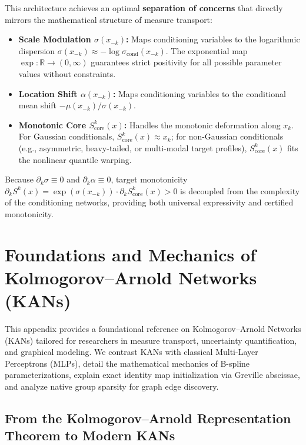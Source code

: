 \documentclass[11pt,a4paper]{article}
\theoremstyle{plain}
\theoremstyle{definition}
\theoremstyle{remark}
\begin{document}
This architecture achieves an optimal \textbf{separation of concerns} that directly mirrors the mathematical structure of measure transport:
\begin{itemize}
    \item \textbf{Scale Modulation $\sigma(x_{-k})$:} Maps conditioning variables to the logarithmic dispersion $\sigma(x_{-k}) \approx -\log \sigma_{\text{cond}}(x_{-k})$. The exponential map $\exp: \mathbb{R} \to (0, \infty)$ guarantees strict positivity for all possible parameter values without constraints.
    \item \textbf{Location Shift $\alpha(x_{-k})$:} Maps conditioning variables to the conditional mean shift $-\mu(x_{-k}) / \sigma(x_{-k})$.
    \item \textbf{Monotonic Core $S^k_{\text{core}}(x)$:} Handles the monotonic deformation along $x_k$. For Gaussian conditionals, $S^k_{\text{core}}(x) \approx x_k$; for non-Gaussian conditionals (e.g., asymmetric, heavy-tailed, or multi-modal target profiles), $S^k_{\text{core}}(x)$ fits the nonlinear quantile warping.
\end{itemize}
Because $\partial_k \sigma \equiv 0$ and $\partial_k \alpha \equiv 0$, target monotonicity $\partial_k S^k(x) = \exp(\sigma(x_{-k})) \cdot \partial_k S^k_{\text{core}}(x) > 0$ is decoupled from the complexity of the conditioning networks, providing both universal expressivity and certified monotonicity.

\section{Foundations and Mechanics of Kolmogorov--Arnold Networks (KANs)}

This appendix provides a foundational reference on Kolmogorov--Arnold Networks (KANs) tailored for researchers in measure transport, uncertainty quantification, and graphical modeling. We contrast KANs with classical Multi-Layer Perceptrons (MLPs), detail the mathematical mechanics of B-spline parameterizations, explain exact identity map initialization via Greville abscissae, and analyze native group sparsity for graph edge discovery.

\subsection{From the Kolmogorov--Arnold Representation Theorem to Modern KANs}
\end{document}
